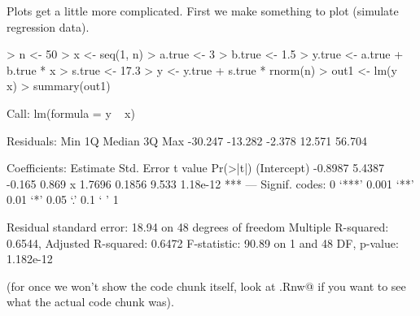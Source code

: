 \documentclass{article}
\begin{document}
\pagebreak[3]
Plots get a little more complicated.  First we make something to plot
(simulate regression data).
\begin{Schunk}
\begin{Sinput}
> n <- 50
> x <- seq(1, n)
> a.true <- 3
> b.true <- 1.5
> y.true <- a.true + b.true * x
> s.true <- 17.3
> y <- y.true + s.true * rnorm(n)
> out1 <- lm(y ~ x)
> summary(out1)
\end{Sinput}
\begin{Soutput}
Call:
lm(formula = y ~ x)

Residuals:
    Min      1Q  Median      3Q     Max 
-30.247 -13.282  -2.378  12.571  56.704 

Coefficients:
            Estimate Std. Error t value Pr(>|t|)    
(Intercept)  -0.8987     5.4387  -0.165    0.869    
x             1.7696     0.1856   9.533 1.18e-12 ***
---
Signif. codes:  0 ‘***’ 0.001 ‘**’ 0.01 ‘*’ 0.05 ‘.’ 0.1 ‘ ’ 1 

Residual standard error: 18.94 on 48 degrees of freedom
Multiple R-squared: 0.6544,	Adjusted R-squared: 0.6472 
F-statistic: 90.89 on 1 and 48 DF,  p-value: 1.182e-12 
\end{Soutput}
\end{Schunk}
(for once we won't show the code chunk itself, look at \verb@foo.Rnw@
if you want to see what the actual code chunk was).
\end{document}
